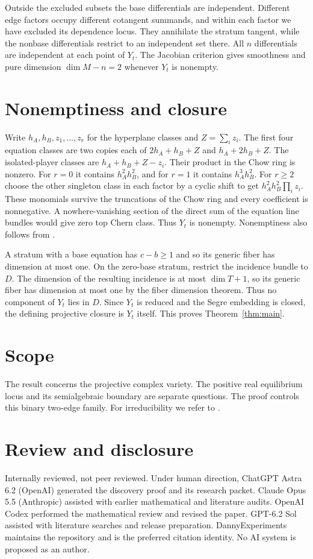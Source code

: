 \documentclass[11pt,a4paper]{amsart}
\begin{document}
Outside the excluded subsets the base differentials are independent.
Different edge factors occupy different cotangent summands, and
within each factor we have excluded its dependence locus. They
annihilate the stratum tangent, while the nonbase differentials
restrict to an independent set there. All $n$ differentials are
independent at each point of $Y_t$. The Jacobian criterion gives
smoothness and pure dimension $\dim M-n=2$ whenever $Y_t$ is nonempty.

\section{Nonemptiness and closure}

Write $h_A,h_B,z_1,\ldots,z_r$ for the hyperplane classes and
$Z=\sum_i z_i$. The first four equation classes are two copies each
of $2h_A+h_B+Z$ and $h_A+2h_B+Z$. The isolated-player classes
are $h_A+h_B+Z-z_i$. Their product in the Chow ring is nonzero.
For $r=0$ it contains $h_A^2h_B^2$, and for $r=1$ it contains
$h_A^3h_B^2$. For $r\geq2$ choose the other singleton class in
each factor by a cyclic shift to get
$h_A^2h_B^2\prod_i z_i$. These monomials survive the truncations
of the Chow ring and every coefficient is nonnegative. A
nowhere-vanishing section of the direct sum of the equation
line bundles would give zero top Chern class. Thus $Y_t$ is
nonempty. Nonemptiness also follows from \cite[Theorem~5.4]{totally}.

A stratum with a base equation has $c-b\geq1$ and so its generic
fiber has dimension at most one. On the zero-base stratum, restrict
the incidence bundle to $D$. The dimension of the resulting
incidence is at most $\dim T+1$, so its generic fiber has dimension
at most one by the fiber dimension theorem. Thus no component
of $Y_t$ lies in $D$. Since $Y_t$ is reduced and the Segre
embedding is closed, the defining projective closure is $Y_t$ itself.
This proves Theorem~\ref{thm:main}.

\section*{Scope}
The result concerns the projective complex variety. The positive
real equilibrium locus and its semialgebraic boundary are separate
questions. The proof controls this binary two-edge family. For
irreducibility we refer to \cite[Theorem~4.4]{totally}.

\section*{Review and disclosure}
Internally reviewed, not peer reviewed. Under human direction,
ChatGPT Astra 6.2 (OpenAI) generated the discovery proof and its
research packet. Claude Opus 5.5 (Anthropic) assisted with earlier
mathematical and literature audits. OpenAI Codex performed the mathematical review and
revised the paper. GPT-6.2 Sol assisted with literature searches and
release preparation. DannyExperiments maintains the repository and
is the preferred citation identity. No AI system is proposed as an
author.
\end{document}
